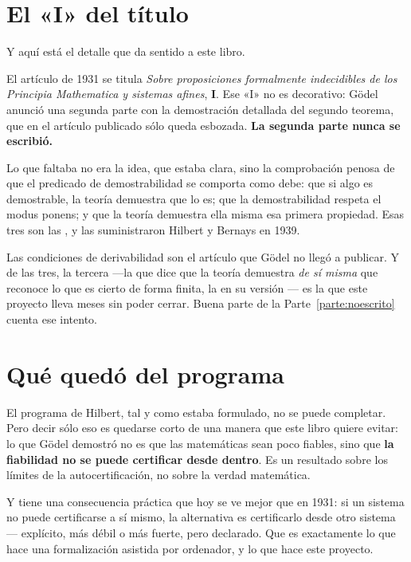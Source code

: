\section{El «I» del título}

Y aquí está el detalle que da sentido a este libro.

El artículo de 1931 se titula \emph{Sobre proposiciones formalmente indecidibles de los Principia
Mathematica y sistemas afines}, \textbf{I}. Ese «I» no es decorativo: Gödel anunció una segunda
parte con la demostración detallada del segundo teorema, que en el artículo publicado sólo queda
esbozada. \textbf{La segunda parte nunca se escribió.}

Lo que faltaba no era la idea, que estaba clara, sino la comprobación penosa de que el predicado de
demostrabilidad se comporta como debe: que si algo es demostrable, la teoría demuestra que lo es;
que la demostrabilidad respeta el modus ponens; y que la teoría demuestra ella misma esa primera
propiedad. Esas tres son las , y las suministraron
Hilbert y Bernays en 1939.

\begin{leccion}
Las condiciones de derivabilidad son el artículo que Gödel no llegó a publicar. Y de las tres, la
tercera —la que dice que la teoría demuestra \emph{de sí misma} que reconoce lo que es cierto de
forma finita, la  en su versión — es la que este
proyecto lleva meses sin poder cerrar. Buena parte de la Parte~\ref{parte:noescrito} cuenta ese intento.
\end{leccion}

\section{Qué quedó del programa}

El programa de Hilbert, tal y como estaba formulado, no se puede completar. Pero decir sólo eso es
quedarse corto de una manera que este libro quiere evitar: lo que Gödel demostró no es que las
matemáticas sean poco fiables, sino que \textbf{la fiabilidad no se puede certificar desde dentro}.
Es un resultado sobre los límites de la autocertificación, no sobre la verdad matemática.

Y tiene una consecuencia práctica que hoy se ve mejor que en 1931: si un sistema no puede
certificarse a sí mismo, la alternativa es certificarlo desde otro sistema — explícito, más débil o
más fuerte, pero declarado. Que es exactamente lo que hace una formalización asistida por ordenador,
y lo que hace este proyecto.
